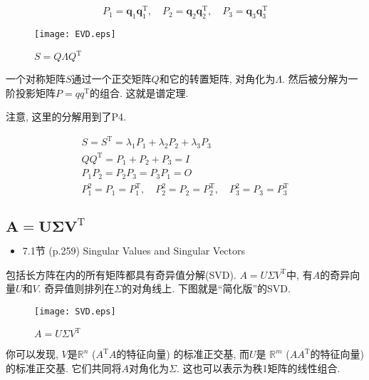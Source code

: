 \documentclass[letterpaper]{article}
\DeclareRobustCommand\transp{^{\mathrm{T}}}
\begin{document}
\begin{equation*}
  P_1=\bm{q}_1 \bm{q}_1\transp, \quad P_2=\bm{q}_2 \bm{q}_2\transp, \quad P_3=\bm{q}_3 \bm{q}_3\transp
\end{equation*}


\begin{figure}[H]
  \centering
  \texttt{[image: EVD.eps]}
  \caption{$S=Q \Lambda Q\transp$}
\end{figure}

一个对称矩阵$S$通过一个正交矩阵$Q$和它的转置矩阵, 对角化为$\Lambda$. 
然后被分解为一阶投影矩阵$P=qq\transp$的组合. 这就是谱定理. 

注意, 这里的分解用到了P4.

\begin{gather*}
  S=S\transp = \lambda_1 P_1 + \lambda_2 P_2 + \lambda_3 P_3\\
  QQ\transp = P_1 + P_2 + P_3 = I \\
  P_1 P_2 = P_2 P_3 = P_3 P_1 = O\\
  P_1^2 =P_1=P_1\transp, \quad P_2^2=P_2=P_2\transp, \quad P_3^2=P_3=P_3\transp
\end{gather*}

\subsection{$\boldsymbol{A=U \Sigma V\transp}$}


\begin{itemize}
  \item 7.1节 (p.259) Singular Values and Singular Vectors
\end{itemize}

包括长方阵在内的所有矩阵都具有奇异值分解(SVD). 
$A=U \Sigma V\transp$中, 有$A$的奇异向量$U$和$V$. 
奇异值则排列在$\Sigma$的对角线上. 
下图就是“简化版”的SVD. 


\begin{figure}[H]
  \centering
  \texttt{[image: SVD.eps]}
  \caption{$A=U \Sigma V\transp$}
\end{figure}

你可以发现, $V$是$\mathbb{R}^n$ ($A\transp A$的特征向量) 的标准正交基, 
而$U$是 $\mathbb{R}^m$ ($AA\transp$的特征向量) 的标准正交基. 
它们共同将$A$对角化为$\Sigma$. 
这也可以表示为秩1矩阵的线性组合. 
\end{document}
